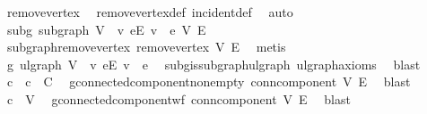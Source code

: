 \begin{isabellebody}
\ remove{\isacharunderscore}{\kern0pt}vertex\ \isamarkupfalse%
\ remove{\isacharunderscore}{\kern0pt}vertex{\isacharunderscore}{\kern0pt}def\ incident{\isacharunderscore}{\kern0pt}def\ \isamarkupfalse%
\ auto\isanewline
\ \ \isamarkupfalse%
\ subg{\isacharcolon}{\kern0pt}\ subgraph\ {\isachardoublequoteopen}V\ {\isacharminus}{\kern0pt}\ {\isacharbraceleft}{\kern0pt}v{\isacharbraceright}{\kern0pt}{\isachardoublequoteclose}\ {\isachardoublequoteopen}{\isacharbraceleft}{\kern0pt}e{\isasymin}E{\isachardot}{\kern0pt}\ v\ {\isasymnotin}\ e{\isacharbraceright}{\kern0pt}{\isachardoublequoteclose}\ V\ E\ \isamarkupfalse%
\ subgraph{\isacharunderscore}{\kern0pt}remove{\isacharunderscore}{\kern0pt}vertex\ remove{\isacharunderscore}{\kern0pt}vertex\ V{\isacharprime}{\kern0pt}\ E{\isacharprime}{\kern0pt}\ \isamarkupfalse%
\ metis\isanewline
\ \ \isamarkupfalse%
\ g{\isacharprime}{\kern0pt}{\isacharcolon}{\kern0pt}\ ulgraph\ {\isachardoublequoteopen}V\ {\isacharminus}{\kern0pt}\ {\isacharbraceleft}{\kern0pt}v{\isacharbraceright}{\kern0pt}{\isachardoublequoteclose}\ {\isachardoublequoteopen}{\isacharbraceleft}{\kern0pt}e{\isasymin}E{\isachardot}{\kern0pt}\ v\ {\isasymnotin}\ e{\isacharbraceright}{\kern0pt}{\isachardoublequoteclose}\ \isamarkupfalse%
\ subg{\isachardot}{\kern0pt}is{\isacharunderscore}{\kern0pt}subgraph{\isacharunderscore}{\kern0pt}ulgraph\ ulgraph{\isacharunderscore}{\kern0pt}axioms\ \isamarkupfalse%
\ blast\isanewline
\ \ \isamarkupfalse%
\ c\ \ {\isachardoublequoteopen}c\ {\isasymin}\ C{\isachardoublequoteclose}\ \isamarkupfalse%
\ g{\isacharprime}{\kern0pt}{\isachardot}{\kern0pt}connected{\isacharunderscore}{\kern0pt}component{\isacharunderscore}{\kern0pt}non{\isacharunderscore}{\kern0pt}empty\ conn{\isacharunderscore}{\kern0pt}component\ V{\isacharprime}{\kern0pt}\ E{\isacharprime}{\kern0pt}\ \isamarkupfalse%
\ blast\isanewline
\ \ \isamarkupfalse%
\ \isamarkupfalse%
\ {\isachardoublequoteopen}c\ {\isasymin}\ V{\isacharprime}{\kern0pt}{\isachardoublequoteclose}\ \isamarkupfalse%
\ g{\isacharprime}{\kern0pt}{\isachardot}{\kern0pt}connected{\isacharunderscore}{\kern0pt}component{\isacharunderscore}{\kern0pt}wf\ conn{\isacharunderscore}{\kern0pt}component\ V{\isacharprime}{\kern0pt}\ E{\isacharprime}{\kern0pt}\ \isamarkupfalse%
\ blast\isanewline
\ \ \isamarkupfalse%

\end{isabellebody}
